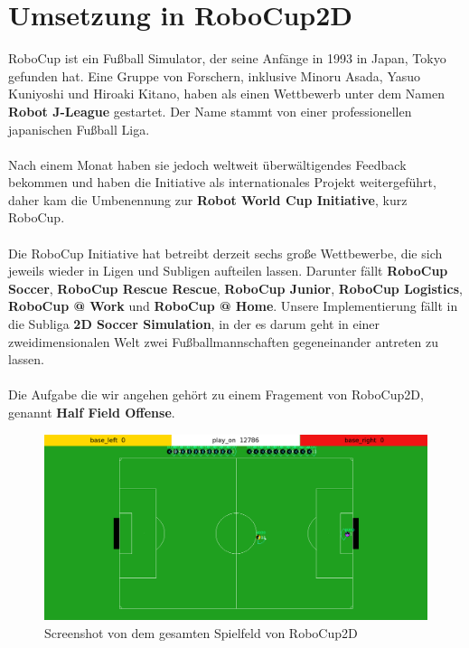 \chapter{Umsetzung in RoboCup2D}
    RoboCup ist ein Fußball Simulator, der seine Anfänge in 1993 in Japan, Tokyo gefunden hat. Eine Gruppe von Forschern, inklusive Minoru Asada, Yasuo Kuniyoshi und Hiroaki Kitano, haben als einen Wettbewerb unter dem Namen \textbf{Robot J-League} gestartet. Der Name stammt von einer professionellen japanischen Fußball Liga.\\
    \\
    Nach einem Monat haben sie jedoch weltweit überwältigendes Feedback bekommen und haben die Initiative als internationales Projekt weitergeführt, daher kam die Umbenennung zur \textbf{Robot World Cup Initiative}, kurz RoboCup. \\
    \\
    Die RoboCup Initiative hat betreibt derzeit sechs große Wettbewerbe, die sich jeweils wieder in Ligen und Subligen aufteilen lassen. Darunter fällt \textbf{RoboCup Soccer}, \textbf{RoboCup Rescue Rescue}, \textbf{RoboCup Junior}, \textbf{RoboCup Logistics}, \textbf{RoboCup @ Work} und \textbf{RoboCup @ Home}. Unsere Implementierung fällt in die Subliga \textbf{2D Soccer Simulation}, in der es darum geht in einer zweidimensionalen Welt zwei Fußballmannschaften gegeneinander antreten zu lassen.\\
    \\
    Die Aufgabe die wir angehen gehört zu einem Fragement von RoboCup2D, genannt \textbf{Half Field Offense}.\\

    \begin{figure}[htbp]
        \includegraphics[width = 1.0\textwidth, center]{../pictures/full-field.png}
        \caption{Screenshot von dem gesamten Spielfeld von RoboCup2D \label{fig:somelabel}}
    \end{figure}

